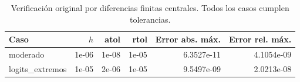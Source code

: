 \begin{table}[htbp]
\centering\small
\caption{Verificación original por diferencias finitas centrales. Todos los casos cumplen tolerancias.}\label{tab:gradientes}
\begin{tabular}{lrrrrr}\toprule
Caso & $h$ & atol & rtol & Error abs. máx. & Error rel. máx. \\ \midrule
moderado & 1e-06 & 1e-08 & 1e-05 & 6.3527e-11 & 4.1054e-09 \\
logits\_extremos & 1e-05 & 2e-06 & 1e-05 & 9.5497e-09 & 2.0213e-08 \\
\bottomrule\end{tabular}
\end{table}
